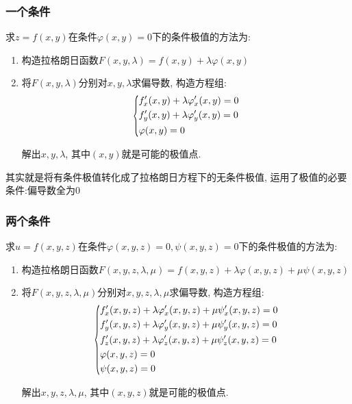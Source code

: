\subsubsection{一个条件}
求$ z=f(x,y) $在条件$ \varphi(x,y)=0 $下的条件极值的方法为:
\begin{enumerate}
\item 构造拉格朗日函数$ F(x,y,\lambda)=f(x,y)+\lambda \varphi(x,y) $
\item 将$ F(x,y,\lambda) $分别对$ x,y,\lambda $求偏导数, 构造方程组:
\begin{equation*}
\scaleleftright[6pt]{\biggl\{}{
\begin{aligned}
& f'_{x}(x,y)+\lambda \varphi'_{x}(x,y)=0 \\
& f'_{y}(x,y)+\lambda \varphi'_{y}(x,y)=0 \\
& \varphi(x,y)=0
\end{aligned}
}{.}
\end{equation*}\par
解出$ x,y,\lambda $, 其中$ (x,y) $就是可能的极值点.
\end{enumerate}\par
其实就是将有条件极值转化成了拉格朗日方程下的无条件极值, 运用了极值的必要条件:偏导数全为$ 0 $
\subsubsection{两个条件}
求$ u=f(x,y,z) $在条件$ \varphi(x,y,z)=0, \psi(x,y,z)=0 $下的条件极值的方法为:
\begin{enumerate}
\item 构造拉格朗日函数$ F(x,y,z,\lambda,\mu)=f(x,y,z)+\lambda \varphi(x,y,z)+\mu \psi(x,y,z) $
\item 将$ F(x,y,z,\lambda,\mu) $分别对$ x,y,z,\lambda,\mu $求偏导数, 构造方程组:
\begin{equation*}
\scaleleftright[6pt]{\biggl\{}{
\begin{aligned}
& f'_{x}(x,y,z)+\lambda \varphi'_{x}(x,y,z)+\mu \psi'_{x}(x,y,z)=0 \\
& f'_{y}(x,y,z)+\lambda \varphi'_{y}(x,y,z)+\mu \psi'_{y}(x,y,z)=0 \\
& f'_{z}(x,y,z)+\lambda \varphi'_{z}(x,y,z)+\mu \psi'_{z}(x,y,z)=0 \\
& \varphi(x,y,z)=0 \\
& \psi(x,y,z)=0
\end{aligned}
}{.}
\end{equation*}\par
解出$ x,y,z,\lambda,\mu $, 其中$ (x,y,z) $就是可能的极值点.
\end{enumerate}
